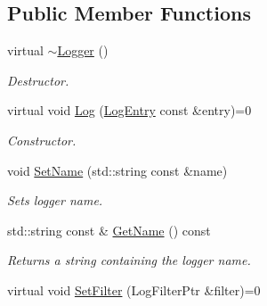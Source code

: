 \subsection*{Public Member Functions}
\begin{DoxyCompactItemize}
\item 
\hypertarget{class_common_1_1_logger_af51d41dfc8d3ded5958beb128177dfc2}{virtual \hyperlink{class_common_1_1_logger_af51d41dfc8d3ded5958beb128177dfc2}{$\sim$\-Logger} ()}\label{class_common_1_1_logger_af51d41dfc8d3ded5958beb128177dfc2}

\begin{DoxyCompactList}\small\item\em Destructor. \end{DoxyCompactList}\item 
virtual void \hyperlink{class_common_1_1_logger_abf06fde5f12a512d49f4cd3cac61f28f}{Log} (\hyperlink{class_common_1_1_log_entry}{Log\-Entry} const \&entry)=0
\begin{DoxyCompactList}\small\item\em Constructor. \end{DoxyCompactList}\item 
\hypertarget{class_common_1_1_logger_aff7c2102e77ad6bc3e78a2f55ba8aff5}{void \hyperlink{class_common_1_1_logger_aff7c2102e77ad6bc3e78a2f55ba8aff5}{Set\-Name} (std\-::string const \&name)}\label{class_common_1_1_logger_aff7c2102e77ad6bc3e78a2f55ba8aff5}

\begin{DoxyCompactList}\small\item\em Sets logger name. \end{DoxyCompactList}\item 
\hypertarget{class_common_1_1_logger_a044d1cae9dbf0ffc0e476346b3199f3f}{std\-::string const \& \hyperlink{class_common_1_1_logger_a044d1cae9dbf0ffc0e476346b3199f3f}{Get\-Name} () const }\label{class_common_1_1_logger_a044d1cae9dbf0ffc0e476346b3199f3f}

\begin{DoxyCompactList}\small\item\em Returns a string containing the logger name. \end{DoxyCompactList}\item 
\hypertarget{class_common_1_1_logger_a9655d916e7e14956c61a5fb55f57d1e3}{virtual void \hyperlink{class_common_1_1_logger_a9655d916e7e14956c61a5fb55f57d1e3}{Set\-Filter} (Log\-Filter\-Ptr \&filter)=0}\label{class_common_1_1_logger_a9655d916e7e14956c61a5fb55f57d1e3}


\end{DoxyCompactItemize}
